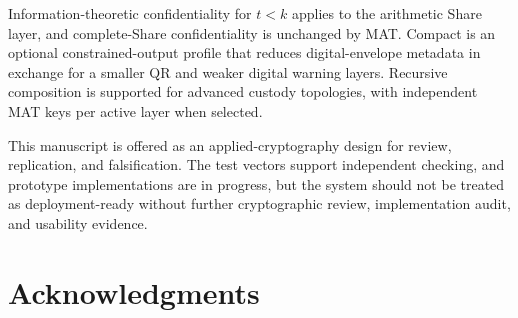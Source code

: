 \documentclass[11pt]{article}
\begin{document}
Information-theoretic confidentiality for $t < k$ applies to the arithmetic Share layer, and complete-Share confidentiality is unchanged by MAT. Compact is an optional constrained-output profile that reduces digital-envelope metadata in exchange for a smaller QR and weaker digital warning layers. Recursive composition is supported for advanced custody topologies, with independent MAT keys per active layer when selected.

This manuscript is offered as an applied-cryptography design for review, replication, and falsification. The test vectors support independent checking, and prototype implementations are in progress, but the system should not be treated as deployment-ready without further cryptographic review, implementation audit, and usability evidence.

\section*{Acknowledgments}
\end{document}
